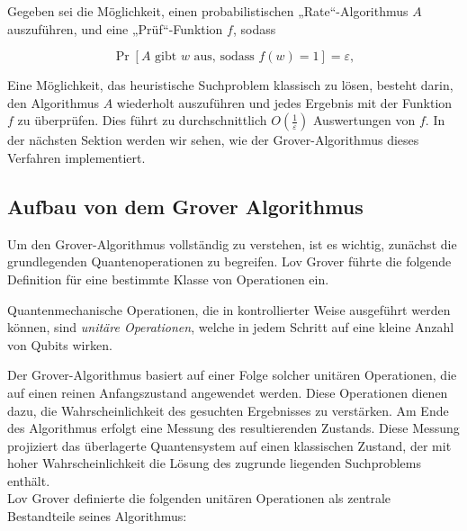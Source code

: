 \begin{definition}
Gegeben sei die Möglichkeit, einen probabilistischen „Rate“-Algorithmus \( A \) auszuführen, und eine „Prüf“-Funktion \( f \), sodass

\[
\Pr\left[ A \text{ gibt } w \text{ aus, sodass } f(w) = 1 \right] = \varepsilon,
\]
\end{definition}

Eine Möglichkeit, das heuristische Suchproblem klassisch zu lösen, besteht darin, den Algorithmus \( A \) wiederholt auszuführen und jedes Ergebnis mit der Funktion \( f \) zu überprüfen. Dies führt zu durchschnittlich \( O\left(\frac{1}{\varepsilon}\right) \) Auswertungen von \( f \). In der nächsten Sektion werden wir sehen, wie der Grover-Algorithmus dieses Verfahren implementiert.

\subsection{Aufbau von dem Grover Algorithmus}

Um den Grover-Algorithmus vollständig zu verstehen, ist es wichtig, zunächst die grundlegenden Quantenoperationen zu begreifen. Lov Grover führte die folgende Definition für eine bestimmte Klasse von Operationen ein.\cite[1-2]{grover-placeholder}

\begin{definition}
Quantenmechanische Operationen, die in kontrollierter Weise ausgeführt werden können, sind \emph{unitäre Operationen}, welche in jedem Schritt auf eine kleine Anzahl von Qubits wirken.
\end{definition}

Der Grover-Algorithmus basiert auf einer Folge solcher unitären Operationen, die auf einen reinen Anfangszustand angewendet werden. Diese Operationen dienen dazu, die Wahrscheinlichkeit des gesuchten Ergebnisses zu verstärken. Am Ende des Algorithmus erfolgt eine Messung des resultierenden Zustands. Diese Messung projiziert das überlagerte Quantensystem auf einen klassischen Zustand, der mit hoher Wahrscheinlichkeit die Lösung des zugrunde liegenden Suchproblems enthält.\\

Lov Grover definierte die folgenden unitären Operationen als zentrale Bestandteile seines Algorithmus:

